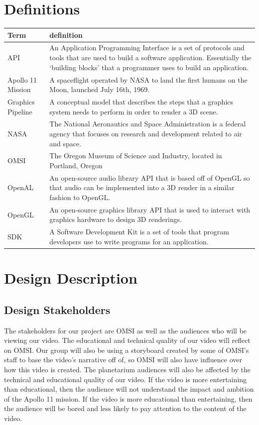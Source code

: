 \documentclass[onecolumn, draftclsnofoot,10pt, compsoc]{IEEEtran}
\begin{document}
\section{Definitions}
\begin{tabular} {|l|p{13.5cm}|}
\hline
Term & definition \\ \hline
API & An Application Programming Interface is a set of protocols and tools that are used to build a software application. Essentially the `building blocks' that a programmer uses to build an application.  \\ \hline
Apollo 11 Mission & A spaceflight operated by NASA to land the first humans on the Moon, launched July 16th, 1969.  \\ \hline
Graphics Pipeline & A conceptual model that describes the steps that a graphics system needs to perform in order to render a 3D scene. \\ \hline
NASA & The National Aeronautics and Space Administration is a federal agency that focuses on research and development related to air and space.	\\ \hline
OMSI & The Oregon Museum of Science and Industry, located in Portland, Oregon	\\ \hline
OpenAL & An open-source audio library API that is based off of OpenGL so that audio can be implemented into a 3D render in a similar fashion to OpenGL. \\ \hline
OpenGL & An open-source graphics library API that is used to interact with graphics hardware to design 3D renderings.	\\ \hline
SDK & A Software Development Kit is a set of tools that program developers use to write programs for an application. \\ \hline

\end{tabular}

\section{Design Description}

    \subsection{Design Stakeholders}
    The stakeholders for our project are OMSI as well as the audiences who will be viewing our video. The educational and technical quality of our video will reflect on OMSI. Our group will also be using a storyboard created by some of OMSI's staff to base the video's narrative off of, so OMSI will also have influence over how this video is created. The planetarium audiences will also be affected by the technical and educational quality of our video. If the video is more entertaining than educational, then the audience will not understand the impact and ambition of the Apollo 11 mission. If the video is more educational than entertaining, then the audience will be bored and less likely to pay attention to the content of the video.
    
\end{document}

